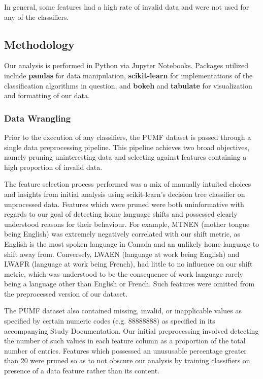 \documentclass[10pt, conference, compsocconf]{IEEEtran}
\begin{document}
In general, some features had a high rate of invalid data and were not used for any of the classifiers.

\subsection{Methodology}

Our analysis is performed in Python via Jupyter Notebooks.  Packages utilized include \textbf{pandas} for data manipulation, \textbf{scikit-learn} for implementations of the classification algorithms in question, and \textbf{bokeh} and \textbf{tabulate} for visualization and formatting of our data.

\subsubsection{Data Wrangling}
Prior to the execution of any classifiers, the PUMF dataset is passed through a single data preprocessing pipeline.  This pipeline achieves two broad objectives, namely pruning uninteresting data and selecting against features containing a high proportion of invalid data.

The feature selection process performed was a mix of manually intuited choices and insights from initial analysis using scikit-learn's decision tree classifier on unprocessed data.  Features which were pruned were both uninformative with regards to our goal of detecting home language shifts and possessed clearly understood reasons for their behaviour.  For example, MTNEN (mother tongue being English) was extremely negatively correlated with our shift metric, as English is the most spoken language in Canada and an unlikely home language to shift away from.  Conversely, LWAEN (language at work being English) and LWAFR (language at work being French), had little to no influence on our shift metric, which was understood to be the consequence of work language rarely being a language other than English or French.  Such features were omitted from the preprocessed version of our dataset.

The PUMF dataset also contained missing, invalid, or inapplicable values as specified by certain numeric codes (e.g.  88888888) as specified in its accompanying Study Documentation.  Our initial preprocessing involved detecting the number of such values in each feature column as a proportion of the total number of entries.  Features which possessed an unususable percentage greater than 20 were pruned so as to not obscure our analysis by training classifiers on presence of a data feature rather than its content.
\end{document}
